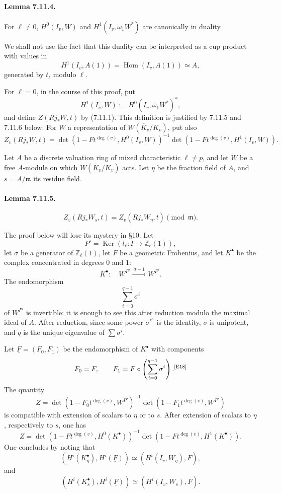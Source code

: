 \documentclass[10pt,letterpaper]{article}
\newcommand{\Hom}{\operatorname{Hom}}
\providecommand{\Ker}{\operatorname{Ker}}
\providecommand{\Hom}{\operatorname{Hom}}
\providecommand{\Hom}{\operatorname{Hom}}
\providecommand{\Hom}{\operatorname{Hom}}
\providecommand{\Ker}{\operatorname{Ker}}
\newcommand{\auditmark}[1]{\textsuperscript{\normalfont\scriptsize[E#1]}}
\begin{document}
\paragraph{Lemma 7.11.4.} For \(\ell\ne0\), \(H^0(I_v,W)\) and \(H^1(I_v,\omega_1W^*)\) are canonically in duality.

We shall not use the fact that this duality can be interpreted as a cup product with values in
\[
H^1(I_v,A(1))=\Hom(I_v,A(1))\simeq A,
\]
generated by \(t_\ell\) modulo \(\ell\).

For \(\ell=0\), in the course of this proof, put
\[
H^1(I_v,W):=H^0(I_v,\omega_1W^*)^*,
\]
and define \(Z(Rj_*W,t)\) by (7.11.1). This definition is justified by 7.11.5 and 7.11.6 below. For \(W\) a representation of \(W(\overline K_v/K_v)\), put also
\[
Z_v(Rj_*W,t)=
\det(1-Ft^{\deg(v)},H^0(I_v,W))^{-1}
\det(1-Ft^{\deg(v)},H^1(I_v,W)).
\]

Let \(A\) be a discrete valuation ring of mixed characteristic \(\ell\ne p\), and let \(W\) be a free \(A\)-module on which \(W(\overline K_v/K_v)\) acts. Let \(\eta\) be the fraction field of \(A\), and \(s=A/\mathfrak m\) its residue field.

\paragraph{Lemma 7.11.5.}
\[
Z_v(Rj_*W_s,t)=Z_v(Rj_*W_\eta,t)\pmod{\mathfrak m}.
\]

The proof below will lose its mystery in §10. Let
\[
P'=\Ker(t_\ell:I\to\mathbb Z_\ell(1)),
\]
let \(\sigma\) be a generator of \(\mathbb Z_\ell(1)\), let \(F\) be a geometric Frobenius, and let \(K^\bullet\) be the complex concentrated in degrees \(0\) and \(1\):
\[
K^\bullet:\quad W^{P'}\xrightarrow{\ \sigma-1\ } W^{P'}.
\]
The endomorphism
\[
\sum_{i=0}^{q-1}\sigma^i
\]
of \(W^{P'}\) is invertible: it is enough to see this after reduction modulo the maximal ideal of \(A\). After reduction, since some power \(\sigma^{\ell^n}\) is the identity, \(\sigma\) is unipotent, and \(q\) is the unique eigenvalue of \(\sum\sigma^i\).

Let \(\underline F=(F_0,F_1)\) be the endomorphism of \(K^\bullet\) with components
\[
F_0=F,\qquad
F_1=F\circ\left(\sum_{i=0}^{q-1}\sigma^i\right).\auditmark{18}
\]
The quantity
\[
Z=\det(1-F_0t^{\deg(v)},W^{P'})^{-1}
\det(1-F_1t^{\deg(v)},W^{P'})
\]
is compatible with extension of scalars to \(\eta\) or to \(s\). After extension of scalars to \(\eta\), respectively to \(s\), one has
\[
Z=\det(1-Ft^{\deg(v)},H^0(K^\bullet))^{-1}
\det(1-Ft^{\deg(v)},H^1(K^\bullet)).
\]
One concludes by noting that
\[
(H^i(K_\eta^\bullet),H^i(\underline F))\simeq(H^i(I_v,W_\eta),F),
\]
and
\[
(H^i(K_s^\bullet),H^i(\underline F))\simeq(H^i(I_v,W_s),F).
\]
\end{document}
